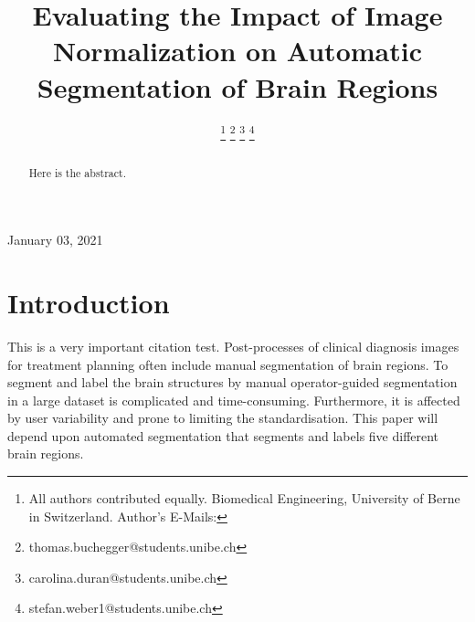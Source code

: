 \documentclass[journal]{IEEEtran}
\begin{document}


\title{Evaluating the Impact of Image Normalization on Automatic Segmentation of Brain Regions}

\author{ 
\and {} 
\and {} 
\thanks{All authors contributed equally. Biomedical Engineering, University of Berne in Switzerland. Author's E-Mails:}%
\thanks{thomas.buchegger@students.unibe.ch}%
\thanks{carolina.duran@students.unibe.ch}%
\thanks{stefan.weber1@students.unibe.ch}}

%
{}
\maketitle
\newpage



\begin{abstract}
Here is the abstract.


\end{abstract}
\hfill January 03, 2021




\section{Introduction}

	This is a very important citation test. \cite{Roohani2018}	
	Post-processes of clinical diagnosis images for treatment planning often include manual segmentation of brain regions. 
	To segment and label the brain structures by manual operator-guided segmentation in a large dataset is complicated and time-consuming. 
	Furthermore, it is affected by user variability and prone to limiting the standardisation. 
	This paper will depend upon automated segmentation that segments and labels five different brain regions. \\
	
\end{document}
